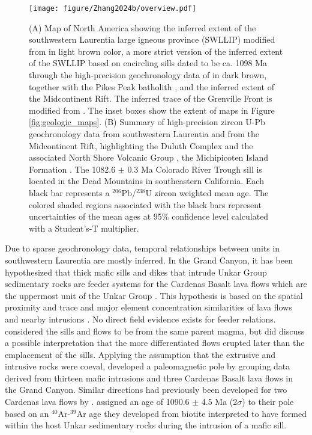 \begin{figure}[h!]
\centering
\texttt{[image: figure/Zhang2024b/overview.pdf]}
\caption[Overview of the inferred extent of the southwestern Laurentia large igneous province and compilation of high-precision zircon U-Pb geochronology data]{(A) Map of North America showing the inferred extent of the southwestern Laurentia large igneous province (SWLLIP) modified from \cite{Bright2014a} in light brown color, a more strict version of the inferred extent of the SWLLIP based on encircling sills dated to be ca. 1098 Ma through the high-precision geochronology data of \cite{Mohr2024a} in dark brown, together with the Pikes Peak batholith \citep{Green1992b}, and the inferred extent of the Midcontinent Rift. The inferred trace of the Grenville Front is modified from \cite{Rivers2015a}. The inset boxes show the extent of maps in Figure \ref{fig:geologic_maps}. (B) Summary of high-precision zircon U-Pb geochronology data from southwestern Laurentia \citep{Mohr2024a} and from the Midcontinent Rift, highlighting the Duluth Complex and the associated North Shore Volcanic Group \citep{Swanson-Hysell2019a, Swanson-Hysell2021a}, the Michipicoten Island Formation \citep{Fairchild2017a}. The 1082.6 $\pm$ 0.3 Ma Colorado River Trough sill is located in the Dead Mountains in southeastern California. Each black bar represents a $^{206}$Pb/$^{238}$U zircon weighted mean age. The colored shaded regions associated with the black bars represent uncertainties of the mean ages at 95\% confidence level calculated with a Student's-T multiplier.}
\label{fig:SWLLIP_overview}
\end{figure}
    
Due to sparse geochronology data, temporal relationships between units in southwestern Laurentia are mostly inferred. In the Grand Canyon, it has been hypothesized that thick mafic sills and dikes that intrude Unkar Group sedimentary rocks are feeder systems for the Cardenas Basalt lava flows which are the uppermost unit of the Unkar Group \cite[e.g.][]{Hammond1990a, Timmons2005a}. This hypothesis is based on the spatial proximity and trace and major element concentration similarities of lava flows and nearby intrusions \citep{Larson1994a}. No direct field evidence exists for feeder relations. \cite{Hendricks1989a} considered the sills and flows to be from the same parent magma, but did discuss a possible interpretation that the more differentiated flows erupted later than the emplacement of the sills. Applying the assumption that the extrusive and intrusive rocks were coeval, \cite{Weil2003a} developed a paleomagnetic pole by grouping data derived from thirteen mafic intrusions and three Cardenas Basalt lava flows in the Grand Canyon. Similar directions had previously been developed for two Cardenas lava flows by \cite{Elston1973a}. \cite{Weil2003a} assigned an age of 1090.6 $\pm$ 4.5 Ma (2$\sigma$) to their pole based on an $^{40}$Ar-$^{39}$Ar age they developed from biotite interpreted to have formed within the host Unkar sedimentary rocks during the intrusion of a mafic sill. 

